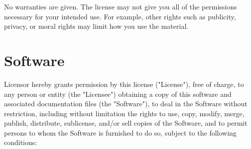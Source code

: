 \documentclass{scrbook}
\begin{document}
No warranties are given. The license may not give you all of the permissions
necessary for your intended use. For example, other rights such as publicity,
privacy, or moral rights may limit how you use the material.

\section*{Software}


Licensor hereby grants permission by this license ("License"), free of charge,
to any person or entity (the "Licensee") obtaining a copy of this software and
associated documentation files (the "Software"), to deal in the Software without
restriction, including without limitation the rights to use, copy, modify,
merge, publish, distribute, sublicense, and/or sell copies of the Software, and
to permit persons to whom the Software is furnished to do so, subject to the
following conditions:
\end{document}
